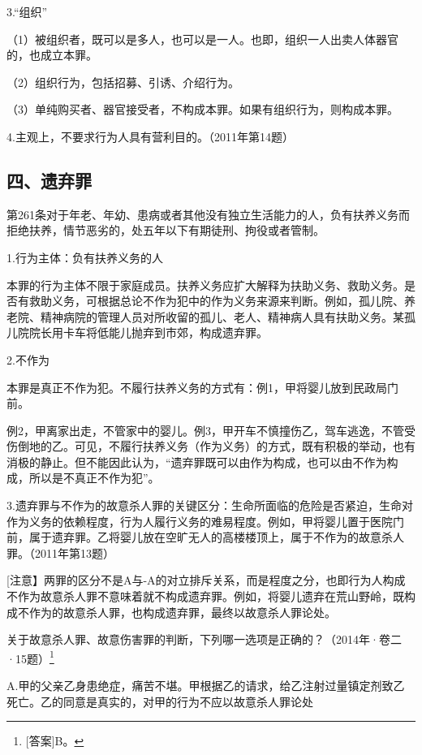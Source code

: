 3.“组织”

（1）被组织者，既可以是多人，也可以是一人。也即，组织一人出卖人体器官的，也成立本罪。

（2）组织行为，包括招募、引诱、介绍行为。

（3）单纯购买者、器官接受者，不构成本罪。如果有组织行为，则构成本罪。

4.主观上，不要求行为人具有营利目的。（2011年第14题）

\subsection*{四、遗弃罪}

第261条对于年老、年幼、患病或者其他没有独立生活能力的人，负有扶养义务而拒绝扶养，情节恶劣的，处五年以下有期徒刑、拘役或者管制。

1.行为主体：负有扶养义务的人

本罪的行为主体不限于家庭成员。扶养义务应扩大解释为扶助义务、救助义务。是否有救助义务，可根据总论不作为犯中的作为义务来源来判断。例如，孤儿院、养老院、精神病院的管理人员对所收留的孤儿、老人、精神病人具有扶助义务。某孤儿院院长用卡车将低能儿抛弃到市郊，构成遗弃罪。

2.不作为

本罪是真正不作为犯。不履行扶养义务的方式有：例1，甲将婴儿放到民政局门前。

例2，甲离家出走，不管家中的婴儿。例3，甲开车不慎撞伤乙，驾车逃逸，不管受伤倒地的乙。可见，不履行扶养义务（作为义务）的方式，既有积极的举动，也有消极的静止。但不能因此认为，“遗弃罪既可以由作为构成，也可以由不作为构成，所以是不真正不作为犯”。

3.遗弃罪与不作为的故意杀人罪的关键区分：生命所面临的危险是否紧迫，生命对作为义务的依赖程度，行为人履行义务的难易程度。例如，甲将婴儿置于医院门前，属于遗弃罪。乙将婴儿放在空旷无人的高楼楼顶上，属于不作为的故意杀人罪。（2011年第13题）

[注意】两罪的区分不是A与-A的对立排斥关系，而是程度之分，也即行为人构成不作为故意杀人罪不意味着就不构成遗弃罪。例如，将婴儿遗弃在荒山野岭，既构成不作为的故意杀人罪，也构成遗弃罪，最终以故意杀人罪论处。


关于故意杀人罪、故意伤害罪的判断，下列哪一选项是正确的？（2014年·卷二·15题）\footnote{[答案]B。}

A.甲的父亲乙身患绝症，痛苦不堪。甲根据乙的请求，给乙注射过量镇定剂致乙死亡。乙的同意是真实的，对甲的行为不应以故意杀人罪论处

